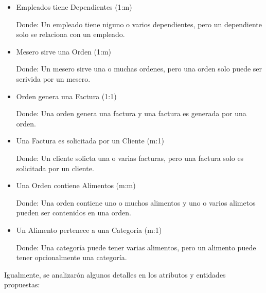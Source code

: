 \documentclass[12pt, letterpaper]{article} %
\begin{document}
\begin{itemize}
    \item Empleados tiene Dependientes (1:m)
    
    Donde: Un empleado tiene niguno o varios dependientes, pero un dependiente solo se relaciona con un empleado.
    
    \item Mesero sirve una Orden (1:m)

    Donde: Un mesero sirve una o muchas ordenes, pero una orden solo puede ser serivida por un mesero.
    
    \item Orden genera una Factura (1:1)

    Donde: Una orden genera una factura y una factura es generada por una orden.
    
    \item Una Factura es solicitada por un Cliente (m:1)

    Donde: Un cliente solicta una o varias facturas, pero una factura solo es solicitada por un cliente.
    
    \item Una Orden contiene Alimentos (m:m)

    Donde: Una orden contiene uno o muchos alimentos y uno o varios alimetos pueden ser contenidos en una orden.
    
    \item Un Alimento pertenece a una Categoria (m:1)

    Donde: Una categoría puede tener varias alimentos, pero un alimento puede tener opcionalmente una categoría.
    
\end{itemize}

Igualmente, se analizarón algunos detalles en los atributos y entidades propuestas:
\end{document}
